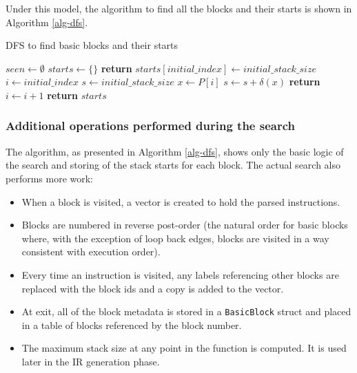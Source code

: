 Under this model, the algorithm to find all the blocks and their starts is shown in Algorithm
\ref{alg-dfs}.

\begin{algorithm}[t]
      \caption{DFS to find basic blocks and their starts}\label{alg-dfs}
      \begin{algorithmic}[1]
            \State $seen \gets \emptyset$
            \State $starts \gets \{\}$
            \State \textbf{return}
            \EndIf
            \State $starts[initial\_index] \gets initial\_stack\_size$
            \State $i \gets initial\_index$
            \State $s \gets initial\_stack\_size$
            \Repeat
            \State $x \gets P[i]$
            \State $s \gets s + \delta(x)$
            \State {}
            \EndFor
            \State {}
            \EndIf
            \State \textbf{return}
            \EndIf
            \State $i \gets i + 1$
            \EndFunction
            \State {}
            \State \textbf{return} $starts$
            \EndFunction
      \end{algorithmic}
\end{algorithm}

\subsubsection{Additional operations performed during the search} \label{addop}

The algorithm, as presented in Algorithm \ref{alg-dfs}, shows only the basic logic of the search
and
storing of the stack starts for each block. The actual search also performs more work:

\begin{itemize}
      \item When a block is visited, a vector is created to hold the parsed instructions.
      \item Blocks are numbered in reverse post-order (the natural order for basic blocks where,
            with the exception of loop back edges, blocks are visited in a way consistent with
            execution order).
      \item Every time an instruction is visited, any labels referencing other blocks are replaced
            with the block ids and a copy is added to the vector.
      \item At exit, all of the block metadata is stored in a \texttt{BasicBlock} struct and placed
            in a table of blocks referenced by the block number.
      \item The maximum stack size at any point in the function is computed. It is used later in
            the IR generation phase.
\end{itemize}

